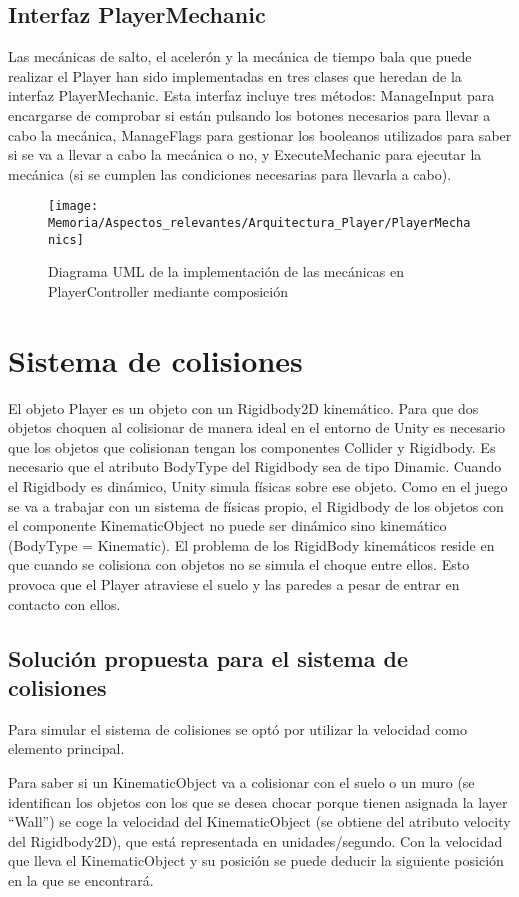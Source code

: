 \subsection{Interfaz PlayerMechanic}
Las mecánicas de salto, el acelerón y la mecánica de tiempo bala que puede realizar el Player han sido implementadas en tres clases que heredan de la interfaz PlayerMechanic. Esta interfaz incluye tres métodos: ManageInput para encargarse de comprobar si están pulsando los botones necesarios para llevar a cabo la mecánica, ManageFlags para gestionar los booleanos utilizados para saber si se va a llevar a cabo la mecánica o no, y ExecuteMechanic para ejecutar la mecánica (si se cumplen las condiciones necesarias para llevarla a cabo).

\begin{figure}[h]
\centering
\texttt{[image: Memoria/Aspectos\_relevantes/Arquitectura\_Player/PlayerMechanics]}
\caption{Diagrama UML de la implementación de las mecánicas en PlayerController mediante composición}
\end{figure}

\section{Sistema de colisiones \cite{ContinuousCollision}\cite{UnderstandingConstraints}}
El objeto Player es un objeto con un Rigidbody2D kinemático. Para que dos objetos choquen al colisionar de manera ideal en el entorno de Unity es necesario que los objetos que colisionan tengan los componentes Collider y Rigidbody. Es necesario que el atributo BodyType del Rigidbody sea de tipo Dinamic. Cuando el Rigidbody es dinámico, Unity simula físicas sobre ese objeto. Como en el juego se va a trabajar con un sistema de físicas propio, el Rigidbody de los objetos con el componente KinematicObject no puede ser dinámico sino kinemático (BodyType = Kinematic). El problema de los RigidBody kinemáticos reside en que cuando se colisiona con objetos no se simula el choque entre ellos. Esto provoca que el Player atraviese el suelo y las paredes a pesar de entrar en contacto con ellos.

\subsection{Solución propuesta para el sistema de colisiones}
Para simular el sistema de colisiones se optó por utilizar la velocidad como elemento principal.

Para saber si un KinematicObject va a colisionar con el suelo o un muro (se identifican los objetos con los que se desea chocar porque tienen asignada la layer “Wall”) se coge la velocidad del KinematicObject (se obtiene del atributo velocity del Rigidbody2D), que está representada en unidades/segundo. Con la velocidad que lleva el KinematicObject y su posición se puede deducir la siguiente posición en la que se encontrará.

